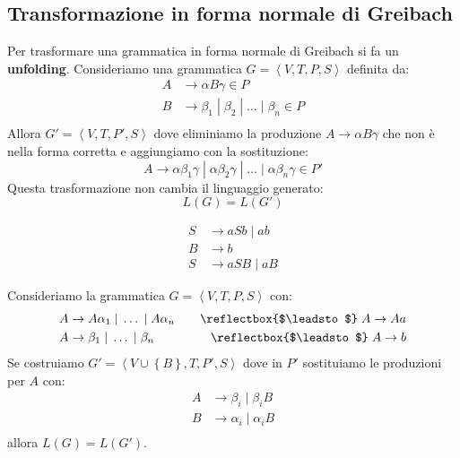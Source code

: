 \documentclass[a4paper]{article}
\begin{document}
\subsection{Transformazione in forma normale di Greibach}
Per trasformare una grammatica in forma normale di Greibach si fa un \textbf{unfolding}.
Consideriamo una grammatica \( G = \left< V, T, P, S \right> \) definita da:
\[
  \begin{aligned}
    A &\to \alpha B \gamma \in P \\
    B &\to \beta_1 \;|\; \beta_2 \;|\; \ldots \;|\; \beta_n \in P \\
  \end{aligned}
\] 
Allora \( G' = \left< V, T, P', S \right> \) dove eliminiamo la produzione \( A \to \alpha B \gamma  \) 
che non è nella forma corretta e aggiungiamo con la sostituzione:
\[
    A \to \alpha \beta_1 \gamma \;|\;
    \alpha \beta_2 \gamma \;|\; \ldots \;|\; \alpha \beta_n \gamma \in P'
\]
Questa trasformazione non cambia il linguaggio generato:
\[
  L(G) = L(G')
\] 

\begin{example}
  \[
    \begin{aligned}
      S &\to a S b \;|\; ab\\
      B &\to b \\
      S &\to aSB \;|\; aB
    \end{aligned}
  \] 
\end{example}

\begin{theorem}
  Consideriamo la grammatica \( G = \left< V, T, P, S \right> \) con:
  \[
    \begin{aligned}
      A &\to  A \alpha_1 \;|\; \ldots \;|\; A \alpha_n \quad &\mathrel{\reflectbox{$\leadsto$}} A \to Aa\\
      A &\to  \beta_1 \;|\; \ldots \;|\; \beta_n \quad &\mathrel{\reflectbox{$\leadsto$}} A \to b \\
    \end{aligned}
  \] 
  Se costruiamo \( G' = \left< V \cup \left\{ B \right\}, T, P', S \right> \) dove
  in \( P' \) sostituiamo le produzioni per \( A \) con:
  \[ 
    \begin{aligned}
      A &\to \beta_i \;|\; \beta_i B\\
      B &\to \alpha_i \;|\; \alpha_i B\\
    \end{aligned}
  \] 
  allora \( L(G) = L(G') \).
\end{theorem}
\end{document}
